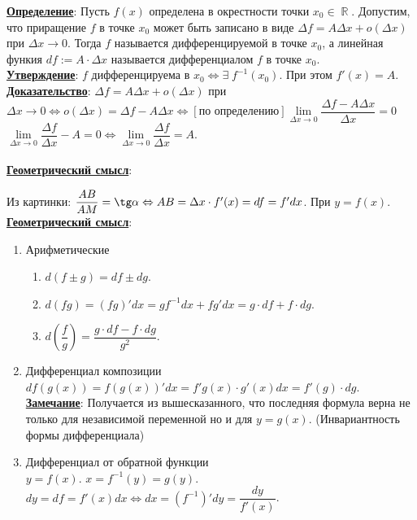 \documentclass{article}
\DeclareMathOperator{\Exists}{\exists}
\DeclareMathOperator{\re}{\mathbb{R}}
\begin{document}
\textbf{\underline{Определение}}: Пусть $f(x)$ определена в окрестности точки $x_0\in\re$. Допустим, что приращение $f$ в точке $x_0$ может быть записано в виде $\Delta f = A\Delta x + o(\Delta x)$ при $\Delta x\to 0$. Тогда $f$ называется дифференцируемой в точке $x_0$, а линейная функия $df := A\cdot\Delta x$ называется дифференциалом $f$ в точке $x_0$.\\
 
\textbf{\underline{Утверждение}}: $f$ дифференцируема в $x_0 \Leftrightarrow \Exists\; f^{-1}(x_0)$. При этом $f'(x) = A$.\\
\textbf{\underline{Доказательство}}:
$\Delta f = A\Delta x + o(\Delta x)$ при $\Delta x\to 0 \Leftrightarrow o(\Delta x) = \Delta f - A\Delta x \Leftrightarrow [\textrm{по определению}] \lim\limits_{\Delta x\to 0}\dfrac{\Delta f - A\Delta x}{\Delta x} = 0$\\
$\lim\limits_{\Delta x\to 0}\dfrac{\Delta f}{\Delta x} - A = 0 \Leftrightarrow \lim\limits_{\Delta x\to 0}\dfrac{\Delta f}{\Delta x} = A$.\\ \\
 
 
\textbf{\underline{Геометрический смысл}}:
\begin{figure}[H]
\end{figure}
Из картинки: $\dfrac{AB}{AM} = \tg\alpha \Leftrightarrow AB = \Delta x\cdot f'(x) = df = f'dx$. При $y = f(x)$.\\
 
\textbf{\underline{Геометрический смысл}}: \\
\begin{enumerate}
   \item Арифметические \\
       \begin{enumerate}
           \item $d(f \pm g) = df\pm dg$.
           \item $d(fg) = (fg)'dx = gf^{-1}dx + fg'dx = g\cdot df + f\cdot dg$.
           \item $d\left(\dfrac{f}{g}\right) = \dfrac{g\cdot df - f\cdot dg}{g^2}$.
       \end{enumerate}
   \item Дифференциал композиции \\
       $df(g(x)) = f(g(x))'dx = f'g(x) \cdot g'(x)dx = f'(g)\cdot dg$.\\
   \textbf{\underline{Замечание}}: Получается из вышесказанного, что последняя формула верна не только для независимой переменной но и для $y = g(x)$. (Инвариантность формы дифференциала)
   
   \item Дифференциал от обратной функции \\
   $y = f(x)$. $x = f^{-1}(y) = g(y)$. \\
   $dy = df = f'(x)dx \Leftrightarrow dx = (f^{-1})'dy = \dfrac{dy}{f'(x)}$.
\end{enumerate}
 
\end{document}
